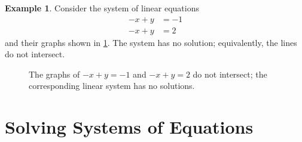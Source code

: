 \documentclass{article}
\theoremstyle{definition}
\newtheorem{example}{Example}
\begin{document}
\begin{example}
    Consider the system of linear equations
    \begin{align*}
        -x+y&=-1 \\
        -x+y&=2
    \end{align*}
    and their graphs shown in \cref{fig:linear-system-3}. The system has no solution; equivalently, the lines do not intersect.

\begin{figure}[H]
    \centering
    \caption{The graphs of \(-x+y=-1\) and \(-x+y=2\) do not intersect; the corresponding linear system has no solutions.}
    \label{fig:linear-system-3}
\end{figure}
\end{example}

\section{Solving Systems of Equations}\label{sec:solving-systems}
\end{document}
